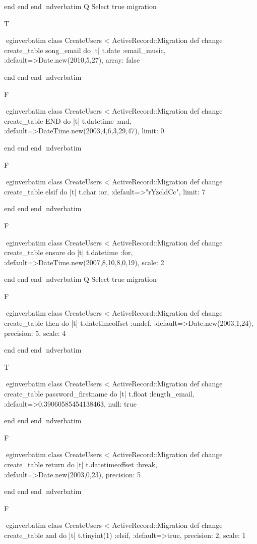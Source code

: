     end 
  end 
end
nd{verbatim}
Q
 Select true migration

T

egin{verbatim}
 class CreateUsers < ActiveRecord::Migration 
  def change 
    create_table song_email do |t| 
      t.date :email_music, :default=>Date.new(2010,5,27), array: false
    
    end 
  end 
end
nd{verbatim}

F

egin{verbatim}
 class CreateUsers < ActiveRecord::Migration 
  def change 
    create_table END do |t| 
      t.datetime :and, :default=>DateTime.new(2003,4,6,3,29,47), limit: 0
    
    end 
  end 
end
nd{verbatim}

F

egin{verbatim}
 class CreateUsers < ActiveRecord::Migration 
  def change 
    create_table elsif do |t| 
      t.char :or, :default=>"rYzcldCc", limit: 7
    
    end 
  end 
end
nd{verbatim}

F

egin{verbatim}
 class CreateUsers < ActiveRecord::Migration 
  def change 
    create_table ensure do |t| 
      t.datetime :for, :default=>DateTime.new(2007,8,10,8,0,19), scale: 2
    
    end 
  end 
end
nd{verbatim}
Q
 Select true migration

F

egin{verbatim}
 class CreateUsers < ActiveRecord::Migration 
  def change 
    create_table then do |t| 
      t.datetimeoffset :undef, :default=>Date.new(2003,1,24), precision: 5, scale: 4
    
    end 
  end 
end
nd{verbatim}

T

egin{verbatim}
 class CreateUsers < ActiveRecord::Migration 
  def change 
    create_table password_firstname do |t| 
      t.float :length_email, :default=>0.39060585454138463, null: true
    
    end 
  end 
end
nd{verbatim}

F

egin{verbatim}
 class CreateUsers < ActiveRecord::Migration 
  def change 
    create_table return do |t| 
      t.datetimeoffset :break, :default=>Date.new(2003,0,23), precision: 5
    
    end 
  end 
end
nd{verbatim}

F

egin{verbatim}
 class CreateUsers < ActiveRecord::Migration 
  def change 
    create_table and do |t| 
      t.tinyint(1) :elsif, :default=>true, precision: 2, scale: 1
    
